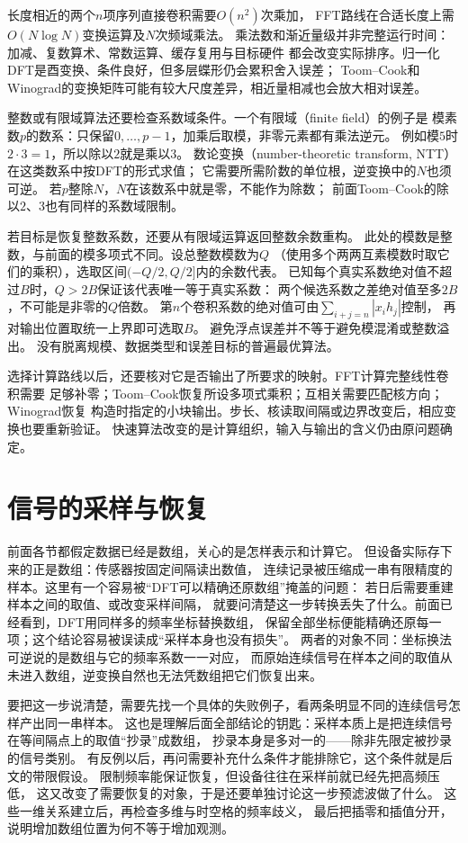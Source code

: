 长度相近的两个$n$项序列直接卷积需要$O(n^2)$次乘加，
FFT路线在合适长度上需$O(N\log N)$变换运算及$N$次频域乘法。
乘法数和渐近量级并非完整运行时间：加减、复数算术、常数运算、缓存复用与目标硬件
都会改变实际排序。归一化DFT是酉变换、条件良好，但多层蝶形仍会累积舍入误差；
Toom--Cook和Winograd的变换矩阵可能有较大尺度差异，相近量相减也会放大相对误差。

整数或有限域算法还要检查系数域条件。一个有限域（finite field）的例子是
模素数$p$的数系：只保留$0,\ldots,p-1$，加乘后取模，非零元素都有乘法逆元。
例如模$5$时$2\cdot3=1$，所以除以$2$就是乘以$3$。
数论变换（number-theoretic transform, NTT）在这类数系中按DFT的形式求值；
它需要所需阶数的单位根，逆变换中的$N$也须可逆。
若$p$整除$N$，$N$在该数系中就是零，不能作为除数；
前面Toom--Cook的除以$2$、$3$也有同样的系数域限制。

若目标是恢复整数系数，还要从有限域运算返回整数余数重构。
此处的模数是整数，与前面的模多项式不同。设总整数模数为$Q$
（使用多个两两互素模数时取它们的乘积），选取区间$(-Q/2,Q/2]$内的余数代表。
已知每个真实系数绝对值不超过$B$时，$Q>2B$保证该代表唯一等于真实系数：
两个候选系数之差绝对值至多$2B$，不可能是非零的$Q$倍数。
第$n$个卷积系数的绝对值可由$\sum_{i+j=n}|x_i h_j|$控制，
再对输出位置取统一上界即可选取$B$。
避免浮点误差并不等于避免模混淆或整数溢出。
没有脱离规模、数据类型和误差目标的普遍最优算法。

选择计算路线以后，还要核对它是否输出了所要求的映射。FFT计算完整线性卷积需要
足够补零；Toom--Cook恢复所设多项式乘积；互相关需要匹配核方向；Winograd恢复
构造时指定的小块输出。步长、核读取间隔或边界改变后，相应变换也要重新验证。
快速算法改变的是计算组织，输入与输出的含义仍由原问题确定。

\section{信号的采样与恢复}
\label{sec:signal-analysis-sampling}

前面各节都假定数据已经是数组，关心的是怎样表示和计算它。
但设备实际存下来的正是数组：传感器按固定间隔读出数值，
连续记录被压缩成一串有限精度的样本。这里有一个容易被“DFT可以精确还原数组”掩盖的问题：
若日后需要重建样本之间的取值、或改变采样间隔，
就要问清楚这一步转换丢失了什么。前面已经看到，DFT用同样多的频率坐标替换数组，
保留全部坐标便能精确还原每一项；这个结论容易被误读成“采样本身也没有损失”。
两者的对象不同：坐标换法可逆说的是数组与它的频率系数一一对应，
而原始连续信号在样本之间的取值从未进入数组，逆变换自然也无法凭数组把它们恢复出来。

要把这一步说清楚，需要先找一个具体的失败例子，看两条明显不同的连续信号怎样产出同一串样本。
这也是理解后面全部结论的钥匙：采样本质上是把连续信号在等间隔点上的取值“抄录”成数组，
抄录本身是多对一的——除非先限定被抄录的信号类别。
有反例以后，再问需要补充什么条件才能排除它，这个条件就是后文的带限假设。
限制频率能保证恢复，但设备往往在采样前就已经先把高频压低，
这又改变了需要恢复的对象，于是还要单独讨论这一步预滤波做了什么。
这些一维关系建立后，再检查多维与时空格的频率歧义，
最后把插零和插值分开，说明增加数组位置为何不等于增加观测。

